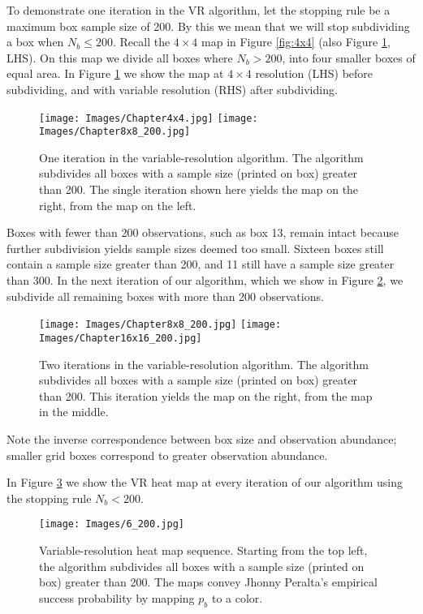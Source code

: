 To demonstrate one iteration in the VR algorithm, let the stopping rule be a maximum box sample size of 200. By this we mean that we will stop subdividing a box when $N_{b} \leq 200$. Recall the $4 \times 4$ map in Figure \ref{fig:4x4} (also Figure \ref{fig:4x4and8x8}, LHS). On this map we divide all boxes where $N_{b} > 200$, into four smaller boxes of equal area. In Figure \ref{fig:4x4and8x8} we show the map at $4 \times 4$ resolution (LHS) before subdividing, and with variable resolution (RHS) after subdividing.
        \begin{figure}[H]
      	\centering
      	\texttt{[image: Images/Chapter4x4.jpg]} 
      	\texttt{[image: Images/Chapter8x8\_200.jpg]} 
      	\caption{One iteration in the variable-resolution algorithm. The algorithm subdivides all boxes with a sample size (printed on box) greater than 200. The single iteration shown here yields the map on the right, from the map on the left.}
      	\label{fig:4x4and8x8}
      	\end{figure} 
Boxes with fewer than 200 observations, such as box 13, remain intact because further subdivision yields sample sizes deemed too small. Sixteen boxes still contain a sample size greater than 200, and 11 still have a sample size greater than 300. In the next iteration of our algorithm, which we show in Figure \ref{fig:8x8to16x16}, we subdivide all remaining boxes with more than 200 observations. 
        \begin{figure}[H]
      	\centering
      	\label{fig:8x8to16x16}
      	\texttt{[image: Images/Chapter8x8\_200.jpg]} 
      	\texttt{[image: Images/Chapter16x16\_200.jpg]} 
      	\caption{Two iterations in the variable-resolution algorithm. The algorithm subdivides all boxes with a sample size (printed on box) greater than 200. This iteration yields the map on the right, from the map in the middle.}
      	\end{figure}
Note the inverse correspondence between box size and observation abundance; smaller grid boxes correspond to greater observation abundance.

In Figure \ref{fig:allvr} we show the VR heat map at every iteration of our algorithm using the stopping rule $N_{b} < 200$.
        \begin{figure}[H]
      	\centering
      	\texttt{[image: Images/6\_200.jpg]}
      	\caption{Variable-resolution heat map sequence. Starting from the top left, the algorithm subdivides all boxes with a sample size (printed on box) greater than 200. The maps convey Jhonny Peralta's empirical success probability by mapping $p_{b}$ to a color.}
      	\label{fig:allvr}
      	\end{figure}
      	
